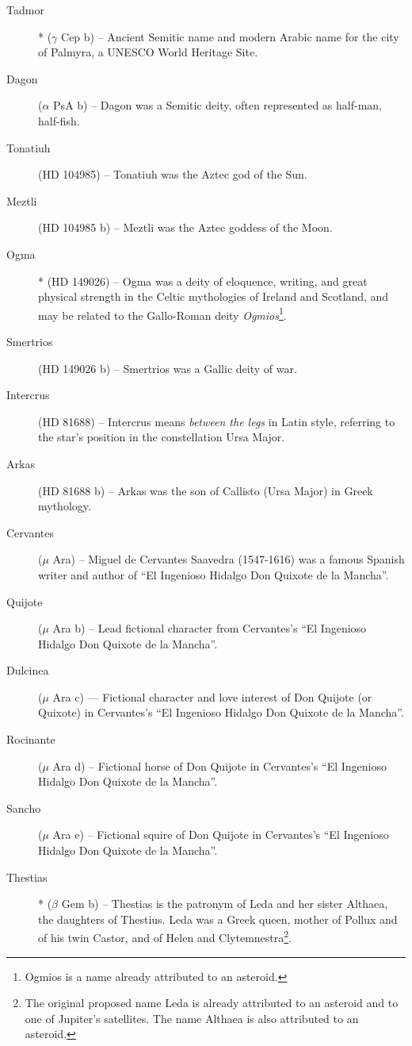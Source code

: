 \begin{description}
\item[Tadmor]* ($\gamma$ Cep b) -- Ancient Semitic name and modern Arabic name for the city of Palmyra, a UNESCO World Heritage Site.
\item[Dagon] ($\alpha$ PsA b) -- Dagon was a Semitic deity, often represented as half-man, half-fish.
\item[Tonatiuh] (HD 104985) -- Tonatiuh was the Aztec god of the Sun.
\item[Meztli] (HD 104985 b) -- Meztli was the Aztec goddess of the Moon.
\item[Ogma]* (HD 149026) -- Ogma was a deity of eloquence, writing, and great physical strength in the Celtic mythologies of Ireland and Scotland, and may be related to the Gallo-Roman deity \textit{Ogmios}\footnote{Ogmios is a name already attributed to an asteroid.}.
\item[Smertrios] (HD 149026 b) -- Smertrios was a Gallic deity of war.
\item[Intercrus] (HD 81688) -- Intercrus means \textit{between the legs} in Latin style, referring to the star's position in the constellation Ursa Major.
\item[Arkas] (HD 81688 b) -- Arkas was the son of Callisto (Ursa Major) in Greek mythology.
\item[Cervantes] ($\mu$ Ara) -- Miguel de Cervantes Saavedra (1547-1616) was a famous Spanish writer and author of ``El Ingenioso Hidalgo Don Quixote de la Mancha''.
\item[Quijote] ($\mu$ Ara b) -- Lead fictional character from Cervantes's ``El Ingenioso Hidalgo Don Quixote de la Mancha''.
\item[Dulcinea]($\mu$ Ara c) — Fictional character and love interest of Don Quijote (or Quixote) in Cervantes's ``El Ingenioso Hidalgo Don Quixote de la Mancha''.
\item[Rocinante] ($\mu$ Ara d) -- Fictional horse of Don Quijote in Cervantes's ``El Ingenioso Hidalgo Don Quixote de la Mancha''.
\item[Sancho] ($\mu$ Ara e) -- Fictional squire of Don Quijote in Cervantes's ``El Ingenioso Hidalgo Don Quixote de la Mancha''.
\item[Thestias]* ($\beta$ Gem b) -- Thestias is the patronym of Leda and her sister Althaea, the daughters of Thestius. Leda was a Greek queen, mother of Pollux and of his twin Castor, and of Helen and Clytemnestra\footnote{The original proposed name Leda is already attributed to an asteroid and to one of Jupiter's satellites. The name Althaea is also attributed to an asteroid.}.

\end{description}

